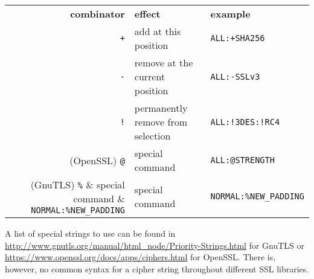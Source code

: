 \begin{center}
\begin{tabular}{rll}
\toprule
\textbf{combinator} & \textbf{effect}                   & \textbf{example}\\\cmidrule(lr){1-3}
           \verb|+| & add at this position              & \verb|ALL:+SHA256|        \\
           \verb|-| & remove at the current position    & \verb|ALL:-SSLv3|         \\
           \verb|!| & permanently remove from selection & \verb|ALL:!3DES:!RC4|     \\
 (OpenSSL) \verb|@| & special command                   & \verb|ALL:@STRENGTH|       \\
  (GnuTLS) \verb|%| & special command                   & \verb|NORMAL:%NEW_PADDING| \\
\bottomrule
\end{tabular}
\end{center}

A list of special strings to use can be found in
\url{http://www.gnutls.org/manual/html_node/Priority-Strings.html} for GnuTLS or
\url{https://www.openssl.org/docs/apps/ciphers.html} for OpenSSL. There is, however, no
common syntax for a cipher string throughout different SSL libraries.
